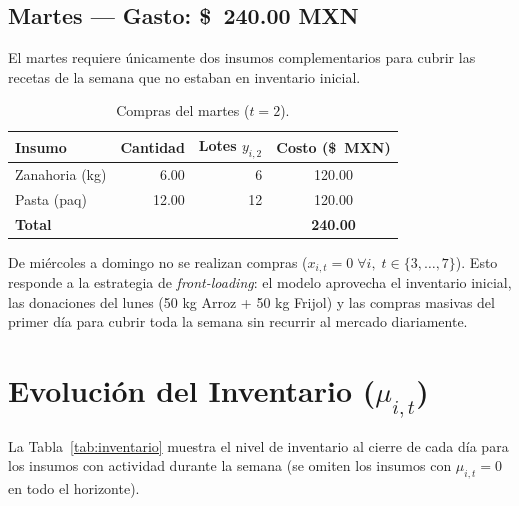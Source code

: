 \documentclass[12pt]{report}
\begin{document}
\subsection{Martes — Gasto: \$~240.00 MXN}

El martes requiere únicamente dos insumos complementarios para cubrir
las recetas de la semana que no estaban en inventario inicial.

\begin{table}[H]
\centering
\renewcommand{\arraystretch}{1.25}
\begin{tabular}{lrrc}
\toprule
\textbf{Insumo} & \textbf{Cantidad} & \textbf{Lotes $y_{i,2}$} & \textbf{Costo (\$~MXN)} \\
\midrule
Zanahoria (kg) & 6.00 & 6  & 120.00 \\
Pasta (paq)    & 12.00 & 12 & 120.00 \\
\midrule
\textbf{Total} &       &    & \textbf{240.00} \\
\bottomrule
\end{tabular}
\caption{Compras del martes ($t = 2$).}
\label{tab:compras_martes}
\end{table}

\noindent De miércoles a domingo no se realizan compras ($x_{i,t} = 0 \;\forall i,\; t \in \{3,\ldots,7\}$).
Esto responde a la estrategia de \emph{front-loading}: el modelo aprovecha el inventario
inicial, las donaciones del lunes (50 kg Arroz + 50 kg Frijol) y las compras masivas del
primer día para cubrir toda la semana sin recurrir al mercado diariamente.

\section{Evolución del Inventario ($\mu_{i,t}$)}

La Tabla~\ref{tab:inventario} muestra el nivel de inventario al cierre de cada día
para los insumos con actividad durante la semana (se omiten los insumos con $\mu_{i,t} = 0$
en todo el horizonte).
\end{document}
